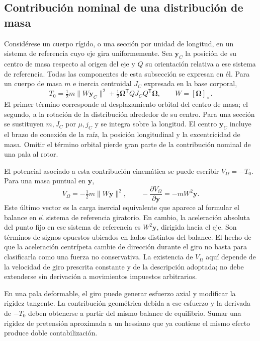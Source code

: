 \documentclass[11pt,a4paper,oneside]{report}
\newcommand{\vct}[1]{\bm{#1}}
\newcommand{\tr}{\mathsf T}
\begin{document}
\subsection{Contribución nominal de una distribución de masa}
Considérese un cuerpo rígido, o una sección por unidad de longitud, en un sistema de referencia cuyo eje gira uniformemente. Sea $\vct y_C$ la posición de su centro de masa respecto al origen del eje y $Q$ su orientación relativa a ese sistema de referencia. Todas las componentes de esta subsección se expresan en él. Para un cuerpo de masa $m$ e inercia centroidal $J_C$ expresada en la base corporal,
\begin{equation}
 T_0=\tfrac12m\|W\vct y_C\|^2
 +\tfrac12\vct\Omega^{\tr}QJ_CQ^{\tr}\vct\Omega,
 \qquad W=[\vct\Omega]_\times.
 \label{eq:T0rigid}
\end{equation}
El primer término corresponde al desplazamiento orbital del centro de masa; el segundo, a la rotación de la distribución alrededor de su centro. Para una sección se sustituyen $m,J_C$ por $\mu,j_C$ y se integra sobre la longitud. El centro $\vct y_C$ incluye el brazo de conexión de la raíz, la posición longitudinal y la excentricidad de masa. Omitir el término orbital pierde gran parte de la contribución nominal de una pala al rotor.

El potencial asociado a esta contribución cinemática se puede escribir $V_\Omega=-T_0$. Para una masa puntual en $\vct y$,
\begin{equation}
 V_\Omega=-\tfrac12m\|W\vct y\|^2,
 \qquad -\frac{\partial V_\Omega}{\partial\vct y}
 =-mW^2\vct y.
\end{equation}
Este último vector es la carga inercial equivalente que aparece al formular el balance en el sistema de referencia giratorio. En cambio, la aceleración absoluta del punto fijo en ese sistema de referencia es $W^2\vct y$, dirigida hacia el eje. Son términos de signos opuestos ubicados en lados distintos del balance. El hecho de que la aceleración centrípeta cambie de dirección durante el giro no basta para clasificarla como una fuerza no conservativa. La existencia de $V_\Omega$ aquí depende de la velocidad de giro prescrita constante y de la descripción adoptada; no debe extenderse sin derivación a movimientos impuestos arbitrarios.

En una pala deformable, el giro puede generar esfuerzo axial y modificar la rigidez tangente. La contribución geométrica debida a ese esfuerzo y la derivada de $-T_0$ deben obtenerse a partir del mismo balance de equilibrio. Sumar una rigidez de pretensión aproximada a un hessiano que ya contiene el mismo efecto produce doble contabilización.
\end{document}
